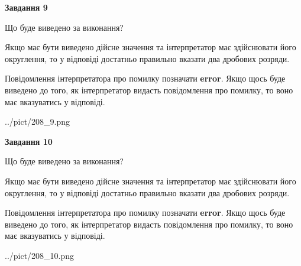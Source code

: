 \documentclass[12pt, ukrainian]{article}
\begin{document}
{\begin {Large}
{\begin {center}\textbf{Завдання 9}\end {center}}\par
Що буде виведено за виконання? \par

Якщо має бути виведено дійсне значення та інтерпретатор має здійснювати його округлення, 
то у відповіді достатньо правильно вказати два дробових розряди.

Повідомлення інтерпретатора про помилку позначати \textbf{error}.
Якщо щось буде виведено до того, як інтерпретатор видасть повідомлення про помилку, 
то воно має вказуватись у відповіді. \par

\begin{center}
	{../pict/208_9.png}
\end{center}
\newpage

{\begin {center}\textbf{Завдання 10}\end {center}}\par
Що буде виведено за виконання? \par

Якщо має бути виведено дійсне значення та інтерпретатор має здійснювати його округлення, 
то у відповіді достатньо правильно вказати два дробових розряди.

Повідомлення інтерпретатора про помилку позначати \textbf{error}.
Якщо щось буде виведено до того, як інтерпретатор видасть повідомлення про помилку, 
то воно має вказуватись у відповіді. \par

\begin{center}
	{../pict/208_10.png}
\end{center}
\newpage

\end {Large}}
\end{document}
